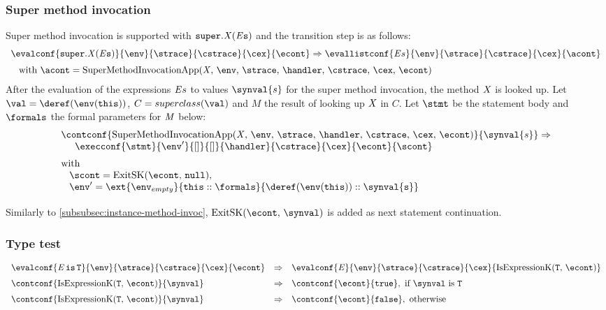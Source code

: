 \documentclass{article}
\begin{document}
\subsubsection{Super method invocation}
\label{subsubsec:super-method-invocation}
\newcommand{\SuperMethodInvocation}[2]{\tt{super}.#1(#2)}
\newcommand{\SuperMethodInvocationApp}{\mathrm{SuperMethodInvocationApp}(\idmeta,\,\env,\,\strace,\,\handler,\,\cstrace,\,\cex,\,\econt)}
Super method invocation is supported with $\SuperMethodInvocation{\idmeta}{\expressionsmeta}$ and the transition step is as follows:
\[
  \begin{array}{l}
	\evalconf{\SuperMethodInvocation{\idmeta}{\expressionsmeta}}{\env}{\strace}{\cstrace}{\cex}{\econt}
	\Rightarrow
	\evallistconf{\expressionsmeta}{\env}{\strace}{\cstrace}{\cex}{\acont}
	\\[2mm]
	\hspace{3mm}\textrm{with } \acont = \SuperMethodInvocationApp
  \end{array}
\]
After the evaluation of the expressions $\mathit{E}{s}$ to values $\synval{s}$ for the super method invocation, the method $\mathit{X}$ is looked up. Let $\val = \deref(\env(\this))$, $C = \superclass{\val}$ and $M$ the result of looking up $\mathit{X}$ in $C$. Let $\stmt$ be the statement body and $\formals$ the formal parameters for $\mathit{M}$ below:
\[
  \begin{array}{l}
	\contconf{\SuperMethodInvocationApp}{\synval{s}}
	\Rightarrow \\
	\hspace{5mm}\execconf{\stmt}{\env'}{[]}{[]}{\handler}{\cstrace}{\cex}{\econt}{\scont}
	\\[2mm]
	\textrm{with }\\
	\hspace{3mm}\scont = \ExitSK{\tt{null}},\\
	\hspace{3mm}\env' = \ext{\env_{empty}}{\this :: \formals}{\deref(\env(\this)) :: \synval{s}}\\[2mm]
  \end{array}
\]
Similarly to \ref{subsubsec:instance-method-invoc}, $\ExitSK{\synval}$ is added as next statement continuation.

\subsubsection{Type test}
\label{subsubsec:type-test}
\newcommand{\IsExpressionK}{\mathrm{IsExpressionK}(\tt{T},\,\econt)}
\[
  \begin{array}{lcl}
	\evalconf{\IsExpression{\expressionmeta}{\tt{T}}}{\env}{\strace}{\cstrace}{\cex}{\econt}
	& \Rightarrow &
	\evalconf{\expressionmeta}{\env}{\strace}{\cstrace}{\cex}{\IsExpressionK}\\[2mm]

	\contconf{\IsExpressionK}{\synval}
	& \Rightarrow &
	\contconf{\econt}{\true}, \textrm{ if }\synval \textrm{ is } \tt{T}\\[2mm]

	\contconf{\IsExpressionK}{\synval}
	& \Rightarrow &
	\contconf{\econt}{\false}, \textrm{ otherwise}
  \end{array}
\]
\end{document}
